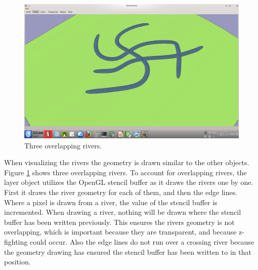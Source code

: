 \documentclass[a4paper,12pt]{report}
\begin{document}
\begin{figure}
\centering
\includegraphics[trim = 30mm 30mm 10mm 20mm, clip,width=.7\linewidth]{thesis/riverOverlap.png}
 \caption{Three overlapping rivers.}
 \label{fig:riverOverlap}
\end{figure}
When visualizing the rivers the geometry is drawn similar to the other objects. Figure \ref{fig:riverOverlap} shows three overlapping rivers. To account for overlapping rivers, the layer object utilizes the OpenGL stencil buffer as it draws the rivers one by one. First it draws the river geometry for each of them, and then the edge lines. Where a pixel is drawn from a river, the value of the stencil buffer is incremented. When drawing a river, nothing will be drawn where the stencil buffer has been written previously. This ensures the rivers geometry is not overlapping, which is important because they are transparent, and because z-fighting could occur. Also the edge lines do not run over a crossing river because the geometry drawing has ensured the stencil buffer has been written to in that position.
\end{document}
